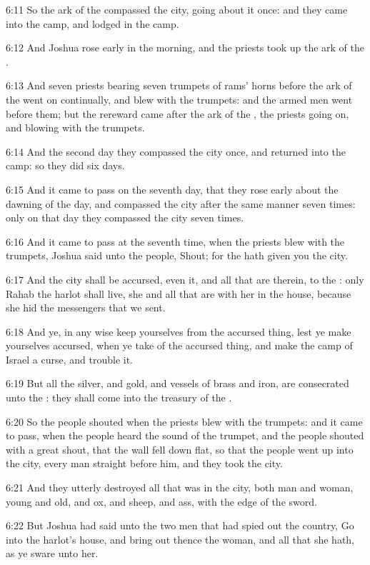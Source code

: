 6:11 So the ark of the \LORD compassed the city, going about it once: and they came into the camp, and lodged in the camp.

6:12 And Joshua rose early in the morning, and the priests took up the ark of the \LORD.

6:13 And seven priests bearing seven trumpets of rams' horns before the ark of the \LORD went on continually, and blew with the trumpets: and the armed men went before them; but the rereward came after the ark of the \LORD, the priests going on, and blowing with the trumpets.

6:14 And the second day they compassed the city once, and returned into the camp: so they did six days.

6:15 And it came to pass on the seventh day, that they rose early about the dawning of the day, and compassed the city after the same manner seven times: only on that day they compassed the city seven times.

6:16 And it came to pass at the seventh time, when the priests blew with the trumpets, Joshua said unto the people, Shout; for the \LORD hath given you the city.

6:17 And the city shall be accursed, even it, and all that are therein, to the \LORD: only Rahab the harlot shall live, she and all that are with her in the house, because she hid the messengers that we sent.

6:18 And ye, in any wise keep yourselves from the accursed thing, lest ye make yourselves accursed, when ye take of the accursed thing, and make the camp of Israel a curse, and trouble it.

6:19 But all the silver, and gold, and vessels of brass and iron, are consecrated unto the \LORD: they shall come into the treasury of the \LORD.

6:20 So the people shouted when the priests blew with the trumpets: and it came to pass, when the people heard the sound of the trumpet, and the people shouted with a great shout, that the wall fell down flat, so that the people went up into the city, every man straight before him, and they took the city.

6:21 And they utterly destroyed all that was in the city, both man and woman, young and old, and ox, and sheep, and ass, with the edge of the sword.

6:22 But Joshua had said unto the two men that had spied out the country, Go into the harlot's house, and bring out thence the woman, and all that she hath, as ye sware unto her.

